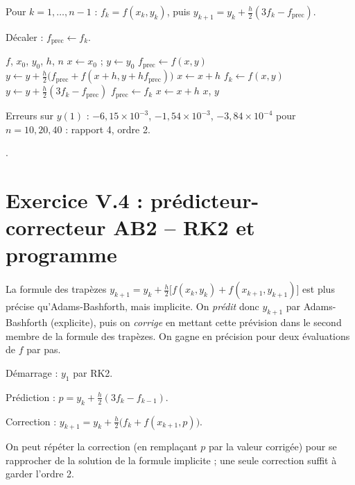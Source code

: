  Pour $k = 1, \dots, n-1$ : $f_k = f(x_k, y_k)$, puis
$y_{k+1} = y_k + \tfrac h2(3f_k - f_{\text{prec}})$.

 Décaler : $f_{\text{prec}} \leftarrow f_k$.

\begin{algo}
  \Require $f$, $x_0$, $y_0$, $h$, $n$
  \State $x \leftarrow x_0$ ; $y \leftarrow y_0$
  \State $f_{\text{prec}} \leftarrow f(x, y)$
  \State $y \leftarrow y + \frac h2\bigl(f_{\text{prec}} + f(x + h, y + h f_{\text{prec}})\bigr)$ 
  \State $x \leftarrow x + h$
    \State $f_k \leftarrow f(x, y)$
    \State $y \leftarrow y + \frac h2(3f_k - f_{\text{prec}})$
    \State $f_{\text{prec}} \leftarrow f_k$
    \State $x \leftarrow x + h$
    \Print $x$, $y$
  \EndFor
\end{algo}

\Verif Erreurs sur $y(1)$ : $-6{,}15\times 10^{-3}$, $-1{,}54\times 10^{-3}$,
$-3{,}84\times 10^{-4}$ pour $n = 10, 20, 40$ : rapport 4, ordre 2.

\Refs {}.

\section{Exercice V.4 : prédicteur-correcteur AB2 -- RK2 et programme}


\Pourquoi La formule des trapèzes
$y_{k+1} = y_k + \tfrac h2\bigl[f(x_k,y_k) + f(x_{k+1},y_{k+1})\bigr]$ est plus
précise qu'Adams-Bashforth, mais implicite. On \emph{prédit} donc $y_{k+1}$ par
Adams-Bashforth (explicite), puis on \emph{corrige} en mettant cette prévision
dans le second membre de la formule des trapèzes. On gagne en précision pour
deux évaluations de $f$ par pas.

\Etapes
{} Démarrage : $y_1$ par RK2.

 Prédiction : $p = y_k + \tfrac h2(3f_k - f_{k-1})$.

 Correction : $y_{k+1} = y_k + \tfrac h2\bigl(f_k + f(x_{k+1}, p)\bigr)$.

 On peut répéter la correction (en remplaçant $p$ par la valeur
corrigée) pour se rapprocher de la solution de la formule implicite ; une seule
correction suffit à garder l'ordre 2.

